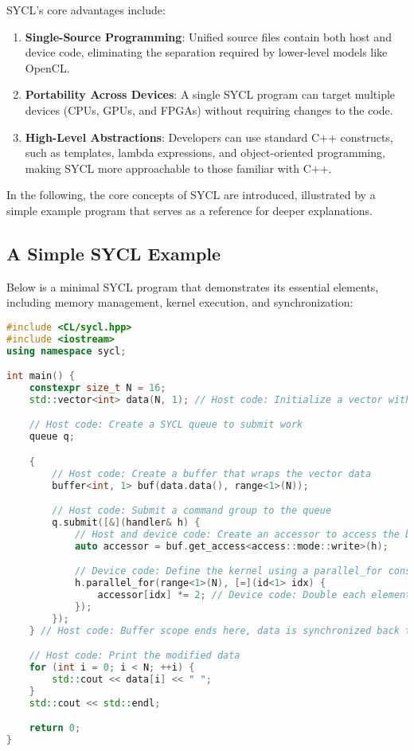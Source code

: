 SYCL’s core advantages include:
\begin{enumerate}
    \item \textbf{Single-Source Programming}: Unified source files contain both host and device code, eliminating the separation
    required by lower-level models like OpenCL.
    \item \textbf{Portability Across Devices}: A single SYCL program can target multiple devices (CPUs, GPUs, and FPGAs) without
    requiring changes to the code.
    \item \textbf{High-Level Abstractions}: Developers can use standard C++ constructs, such as templates, lambda expressions, and
    object-oriented programming, making SYCL more approachable to those familiar with C++.
\end{enumerate}

In the following, the core concepts of SYCL are introduced, illustrated by a simple example program that serves as a reference for
deeper explanations.

\subsection{A Simple SYCL Example}

Below is a minimal SYCL program that demonstrates its essential elements, including memory management, kernel execution, and
synchronization:

\begin{lstlisting}[language=C++, caption={A Simple SYCL Program}, label={lst:sycl-example}]
#include <CL/sycl.hpp>
#include <iostream>
using namespace sycl;

int main() {
    constexpr size_t N = 16;
    std::vector<int> data(N, 1); // Host code: Initialize a vector with 16 elements, all set to 1

    // Host code: Create a SYCL queue to submit work
    queue q;

    {
        // Host code: Create a buffer that wraps the vector data
        buffer<int, 1> buf(data.data(), range<1>(N));

        // Host code: Submit a command group to the queue
        q.submit([&](handler& h) {
            // Host and device code: Create an accessor to access the buffer in write mode
            auto accessor = buf.get_access<access::mode::write>(h);

            // Device code: Define the kernel using a parallel_for construct
            h.parallel_for(range<1>(N), [=](id<1> idx) {
                accessor[idx] *= 2; // Device code: Double each element
            });
        });
    } // Host code: Buffer scope ends here, data is synchronized back to the host

    // Host code: Print the modified data
    for (int i = 0; i < N; ++i) {
        std::cout << data[i] << " ";
    }
    std::cout << std::endl;

    return 0;
}
\end{lstlisting}

